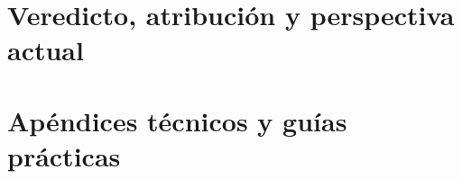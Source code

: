 \documentclass[10pt,twoside,openright]{book}
\begin{document}
\part{Veredicto, atribución y perspectiva actual}




\appendix
\part{Apéndices técnicos y guías prácticas}







\backmatter


\end{document}
